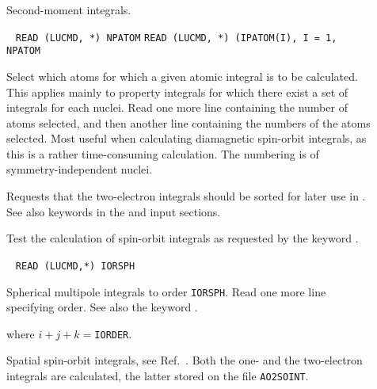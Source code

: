 \begin{description}
\item[] Second-moment integrals.


\item[]\verb| |\newline
\verb|READ (LUCMD, *) NPATOM|\newline
\verb|READ (LUCMD, *) (IPATOM(I), I = 1, NPATOM|

Select which atoms for which a given atomic integral is to be
calculated. This applies mainly to property integrals for which
there exist a set of integrals for each nuclei. Read one more line
containing the number of atoms selected, and then another line
containing the numbers of the atoms selected. Most useful when
calculating diamagnetic spin-orbit
integrals, as this is a rather time-consuming calculation. The
numbering is of symmetry-independent nuclei.

\item[] Requests that the
two-electron integrals should be
sorted for later use in \sir . See also keywords  in the
 and  input sections.

\item[] Test the calculation of spin-orbit integrals as
requested by the keyword .

\item[]\verb| |\newline
\verb|READ (LUCMD,*) IORSPH|

Spherical multipole integrals to order
\verb|IORSPH|. Read one more
line specifying order. See also the keyword .

where $i+j+k =$\verb|IORDER|.

\item[] Spatial spin-orbit
integrals, see Ref.~\cite{ovhapjhjajthjojcp96}. Both the one- and the
two-electron integrals are calculated, the latter stored on the file
\verb|AO2SOINT|.


\end{description}
